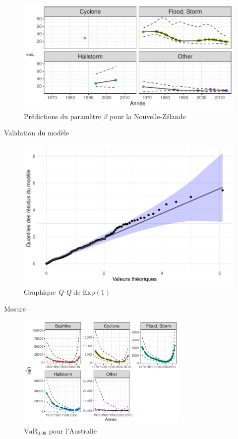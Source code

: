\begin{frame}
\begin{figure}
\includegraphics[width=.8\textwidth]{images/fig-028.pdf}
\caption{Prédictions du paramètre $\beta$ pour la Nouvelle-Zélande}
\end{figure}
\end{frame}



\begin{frame}{Validation du modèle}
\begin{figure}
\includegraphics[width=.6\textwidth]{images/fig-030.pdf}
\caption{Graphique \textit{Q-Q} de $\text{Exp}(1)$}
\end{figure}
\end{frame}


\begin{frame}{Mesure }
\begin{figure}
\includegraphics[width=.75\textwidth, height=5.5cm]{images/fig-031.pdf}
\caption{$\widehat{\text{VaR}_{0.99}}$ pour l'Australie}
\end{figure}
\end{frame}

